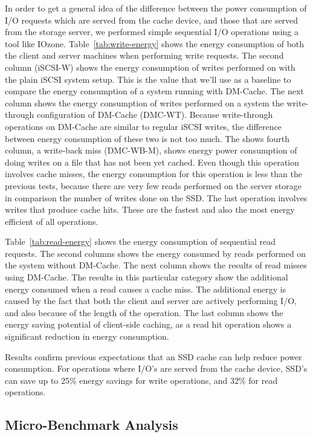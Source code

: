 In order to get a general idea of the difference between the power consumption
of I/O requests which are served from the cache device, and those that are
served from the storage server, we performed simple sequential I/O operations
using a tool like IOzone. Table~\ref{tab:write-energy} shows the energy
consumption of both the client and server machines when performing write
requests. The second column (iSCSI-W) shows the energy consumption of writes
performed on with the plain iSCSI system setup. This is the value that we'll use
as a baseline to compare the energy consumption of a system running with
DM-Cache. The next column shows the energy consumption of writes performed on a
system the write-through configuration of DM-Cache (DMC-WT).  Because
write-through operations on DM-Cache are similar to regular iSCSI writes, the
difference between energy consumption of these two is not too much.  The shows
fourth column, a write-back miss (DMC-WB-M), shows energy power consumption of
doing writes on a file that has not been yet cached. Even though this operation
involves cache misses, the energy consumption for this operation is less than
the previous tests, because there are very few reads performed on the server
storage in comparison the number of writes done on the SSD. The last operation
involves writes that produce cache hits. These are the fastest and also the most
energy efficient of all operations.

Table~\ref{tab:read-energy} shows the energy consumption of sequential read
requests. The second columns shows the energy consumed by reads performed on the
system without DM-Cache. The next column shows the results of read misses using
DM-Cache. The results in this particular category show the additional energy
consumed when a read causes a cache miss. The additional energy is caused by the
fact that both the client and server are actively performing I/O, and also
because of the length of the operation. The last column shows the energy saving
potential of client-side caching, as a read hit operation shows a significant
reduction in energy consumption.

Results confirm previous expectations that an SSD cache can help reduce power
consumption. For operations where I/O's are served from the cache device, SSD's
can save up to 25\% energy savings for write operations, and 32\% for read
operations.

\subsection{Micro-Benchmark Analysis}

